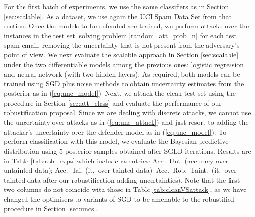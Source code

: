 For the first batch of experiments, we use the same classifiers as in
 Section \ref{sec:scalable}. As a dataset, we use again the UCI Spam Data Set from that section. Once the models to be defended are trained, we perform attacks
over the instances in the test set, solving 
problem \eqref{random_att_prob_n} for each test spam email, removing the uncertainty that is not present from the adversary's point of view. 
We next evaluate the scalable approach in Section \ref{sec:scalable} under the two differentiable models
among the previous ones: logistic regression and neural network (with two hidden layers). %
As required, both models can be trained using SGD plus noise methods to obtain uncertainty estimates from the posterior as in (\ref{eq:unc_model}). %
Next, we attack the clean test set using the procedure 
in Section \ref{sec:att_class} and evaluate the performance of 
our robustification proposal. %
Since we are dealing with discrete attacks, we cannot use the uncertainty over attacks as in (\ref{eq:unc_attack}) and just resort to adding the attacker's uncertainty over the defender model as in (\ref{eq:unc_model}). To perform classification with this model, we evaluate the Bayesian predictive distribution using $5$ posterior samples obtained after SGLD iterations.
Results are in Table \ref{tab:rob_exps} which include as 
entries:
Acc.\ Unt. (accuracy over untainted data); 
Acc.\ Tai. (it.\ over tainted data);
Acc.\ Rob.\ Taint.\ (it.\ over tainted data after
our robustification adding uncertainties).
Note that the first two columns do not coincide with those
in Table \ref{tab:cleanVSattack}, as we have changed 
the optimisers to variants of SGD to be amenable to  
the robustified procedure in Section \ref{sec:uncs}.


